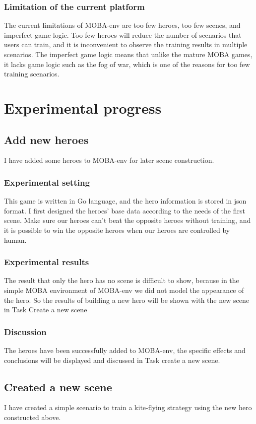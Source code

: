 \documentclass[runningheads]{llncs}
\begin{document}
\subsubsection{Limitation of the current platform}
The current limitations of MOBA-env are too few heroes, too few scenes, and imperfect game logic. Too few heroes will reduce the number of scenarios that users can train, and it is inconvenient to observe the training results in multiple scenarios. The imperfect game logic means that unlike the mature MOBA games, it lacks game logic such as the fog of war, which is one of the reasons for too few training scenarios.

\section{Experimental progress}

\subsection{Add new heroes}
\qquad I have added some heroes to MOBA-env for later scene construction. 
\subsubsection{Experimental setting} This game is written in Go language, and the hero information is stored in json format. I first designed the heroes' base data according to the needs of the first scene. Make sure our heroes can't beat the opposite heroes without training, and it is possible to win the opposite heroes when our heroes are controlled by human.
\subsubsection{Experimental results} The result that only the hero has no scene is difficult to show, because in the simple MOBA environment of MOBA-env we did not model the appearance of the hero. So the results of building a new hero will be shown with the new scene in Task {Create a new scene}

\subsubsection{Discussion}
The heroes have been successfully added to MOBA-env, the specific effects and conclusions will be displayed and discussed in Task {create a new scene}.
\subsection{Created a new scene}
\qquad I have created a simple scenario to train a kite-flying strategy using the new hero constructed above.
\end{document}
